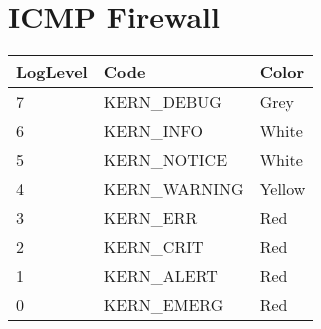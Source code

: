 \documentclass[10pt, a4paper, onecolumn, openany]{book} %
\begin{document}
\section{ICMP Firewall}
\begin{center}
    \begin{small}
    \begin{tabular}{|p{2cm}|p{4cm}|p{1cm}|}
    \hline
    \textbf{LogLevel} & \textbf{Code} & \textbf{Color} \\
    \hline
    7 & KERN\_DEBUG & Grey \\
    \hline
    6 & KERN\_INFO & White \\
    \hline
    5 & KERN\_NOTICE & White \\
    \hline
    4 & KERN\_WARNING & Yellow \\
    \hline
    3 & KERN\_ERR & Red \\
    \hline
    2 & KERN\_CRIT & Red \\
    \hline
    1 & KERN\_ALERT & Red \\
    \hline
    0 & KERN\_EMERG & Red \\
    \hline
    \end{tabular}
    \end{small}
\end{center}
\end{document}
